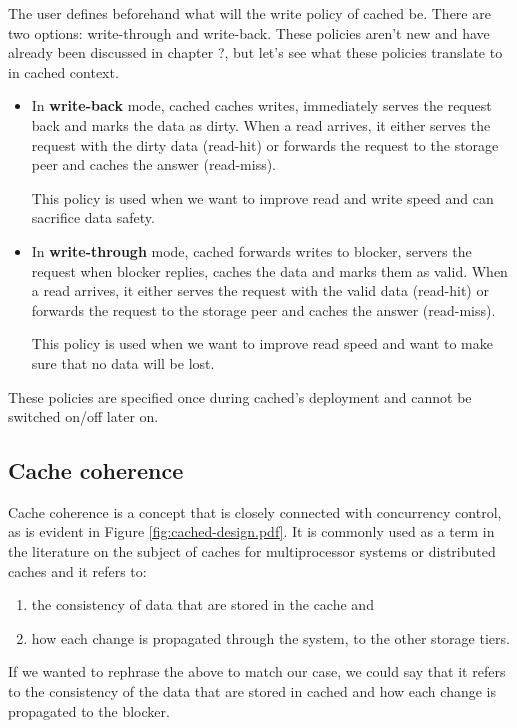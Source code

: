 The user defines beforehand what will the write policy of cached be. There are 
two options: write-through and write-back. These policies aren't new and have 
already been discussed in chapter ?, but let's see what these policies 
translate to in cached context.

\begin{itemize}
	\item
		In \textbf{write-back} mode, cached caches writes, immediately 
		serves the request back and marks the data as dirty. When a read 
		arrives, it either serves the request with the dirty data 
		(read-hit) or forwards the request to the storage peer and 
		caches the answer (read-miss).

		This policy is used when we want to improve read and write speed 
		and can sacrifice data safety.
	\item
		In \textbf{write-through} mode, cached forwards writes to 
		blocker, servers the request when blocker replies, caches the 
		data and marks them as valid.  When a read arrives, it either 
		serves the request with the valid data (read-hit) or forwards 
		the request to the storage peer and caches the answer 
		(read-miss).

		This policy is used when we want to improve read speed and want 
		to make sure that no data will be lost.
\end{itemize}	

These policies are specified once during cached's deployment and cannot be 
switched on/off later on.

\subsection{Cache coherence}

Cache coherence is a concept that is closely connected with concurrency 
control, as is evident in Figure \ref{fig:cached-design.pdf}. It is commonly 
used as a term in the literature on the subject of caches for multiprocessor 
systems or distributed caches and it refers to:

\begin{enumerate}
	\item the consistency of data that are stored in the cache and
	\item how each change is propagated through the system, to the other 
		storage tiers.\label{list:second-coherence}
\end{enumerate}

If we wanted to rephrase the above to match our case, we could say that it 
refers to the consistency of the data that are stored in cached and how each 
change is propagated to the blocker.

